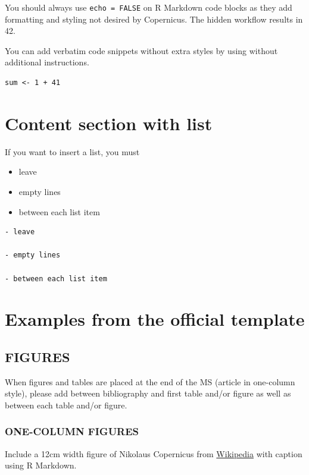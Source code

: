 \documentclass[gc, manuscript]{copernicus}
\begin{document}
You should always use \texttt{echo\ =\ FALSE} on R Markdown code blocks as they add formatting and styling not desired by Copernicus.
The hidden workflow results in 42.

You can add verbatim code snippets without extra styles by using \texttt{\textasciigrave{}\textasciigrave{}\textasciigrave{}} without additional instructions.

\begin{verbatim}
sum <- 1 + 41
\end{verbatim}

\section{Content section with list}

If you want to insert a list, you must

\begin{itemize}
\item
  leave
\item
  empty lines
\item
  between each list item
\end{itemize}

\begin{verbatim}
- leave

- empty lines

- between each list item
\end{verbatim}

\section{Examples from the official template}

\subsection{FIGURES}

When figures and tables are placed at the end of the MS (article in one-column style), please add \clearpage between bibliography and first table and/or figure as well as between each table and/or figure.

\subsubsection{ONE-COLUMN FIGURES}

Include a 12cm width figure of Nikolaus Copernicus from \href{https://en.wikipedia.org/wiki/File:Nikolaus_Kopernikus.jpg}{Wikipedia} with caption using R Markdown.
\end{document}
